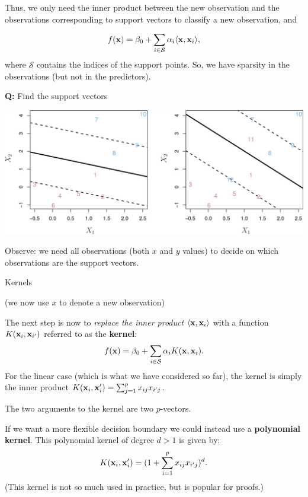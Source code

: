 \documentclass[ignorenonframetext,]{beamer}
\begin{document}
\begin{frame}

Thus, we only need the inner product between the new observation and the
observations corresponding to support vectors to classify a new
observation, and

\[
f({\bf x})=\beta_0 + \sum_{i \in \mathcal{S}} \alpha_i \langle {\bf x}, {\bf x}_i\rangle,
\] where \(\mathcal{S}\) contains the indices of the support points. So,
we have sparsity in the observations (but not in the predictors).

\end{frame}

\begin{frame}

\textbf{Q:} Find the support vectors

\includegraphics{../ISLR/Chapter9/9.6.png}

Observe: we need all observations (both \(x\) and \(y\) values) to
decide on which observations are the support vectors.

\end{frame}

\begin{frame}

\begin{block}{Kernels}

(we now use \(x\) to denote a new observation)

The next step is now to \emph{replace the inner product}
\(\langle {\bf x}, {\bf x}_i\rangle\) with a function
\(K({\bf x}_i,{\bf x}_{i'})\) referred to as the \textbf{kernel}: \[
f({\bf x})=\beta_0 + \sum_{i \in \mathcal{S}} \alpha_i K({\bf x},{\bf x}_i).
\] For the linear case (which is what we have considered so far), the
kernel is simply the inner product
\(K({\bf x}_i,{\bf x}_i')=\sum_{j=1}^p x_{ij}x_{i'j}\).

The two arguments to the kernel are two \(p\)-vectors.

If we want a more flexible decision boundary we could instead use a
\textbf{polynomial kernel}. This polynomial kernel of degree \(d>1\) is
given by: \[
K({\bf x}_i,{\bf x}_i')=(1+\sum_{i=1}^p x_{ij} x_{i'j})^d.
\] (This kernel is not so much used in practice, but is popular for
proofs.)

\end{block}

\end{frame}
\end{document}
